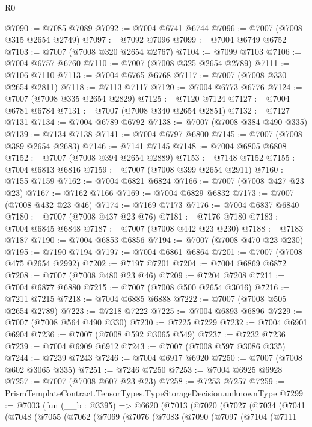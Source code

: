 \begin{lexlean}{R0}
\begin{coremodule}
@7090 := @7085 @7089
@7092 := @7004 @6741 @6744
@7096 := @7007 (@7008 @315 @2654 @2749)
@7097 := @7092 @7096
@7099 := @7004 @6749 @6752
@7103 := @7007 (@7008 @320 @2654 @2767)
@7104 := @7099 @7103
@7106 := @7004 @6757 @6760
@7110 := @7007 (@7008 @325 @2654 @2789)
@7111 := @7106 @7110
@7113 := @7004 @6765 @6768
@7117 := @7007 (@7008 @330 @2654 @2811)
@7118 := @7113 @7117
@7120 := @7004 @6773 @6776
@7124 := @7007 (@7008 @335 @2654 @2829)
@7125 := @7120 @7124
@7127 := @7004 @6781 @6784
@7131 := @7007 (@7008 @340 @2654 @2851)
@7132 := @7127 @7131
@7134 := @7004 @6789 @6792
@7138 := @7007 (@7008 @384 @490 @335)
@7139 := @7134 @7138
@7141 := @7004 @6797 @6800
@7145 := @7007 (@7008 @389 @2654 @2683)
@7146 := @7141 @7145
@7148 := @7004 @6805 @6808
@7152 := @7007 (@7008 @394 @2654 @2889)
@7153 := @7148 @7152
@7155 := @7004 @6813 @6816
@7159 := @7007 (@7008 @399 @2654 @2911)
@7160 := @7155 @7159
@7162 := @7004 @6821 @6824
@7166 := @7007 (@7008 @427 @23 @23)
@7167 := @7162 @7166
@7169 := @7004 @6829 @6832
@7173 := @7007 (@7008 @432 @23 @46)
@7174 := @7169 @7173
@7176 := @7004 @6837 @6840
@7180 := @7007 (@7008 @437 @23 @76)
@7181 := @7176 @7180
@7183 := @7004 @6845 @6848
@7187 := @7007 (@7008 @442 @23 @230)
@7188 := @7183 @7187
@7190 := @7004 @6853 @6856
@7194 := @7007 (@7008 @470 @23 @230)
@7195 := @7190 @7194
@7197 := @7004 @6861 @6864
@7201 := @7007 (@7008 @475 @2654 @2992)
@7202 := @7197 @7201
@7204 := @7004 @6869 @6872
@7208 := @7007 (@7008 @480 @23 @46)
@7209 := @7204 @7208
@7211 := @7004 @6877 @6880
@7215 := @7007 (@7008 @500 @2654 @3016)
@7216 := @7211 @7215
@7218 := @7004 @6885 @6888
@7222 := @7007 (@7008 @505 @2654 @2789)
@7223 := @7218 @7222
@7225 := @7004 @6893 @6896
@7229 := @7007 (@7008 @564 @490 @330)
@7230 := @7225 @7229
@7232 := @7004 @6901 @6904
@7236 := @7007 (@7008 @592 @3065 @549)
@7237 := @7232 @7236
@7239 := @7004 @6909 @6912
@7243 := @7007 (@7008 @597 @3086 @335)
@7244 := @7239 @7243
@7246 := @7004 @6917 @6920
@7250 := @7007 (@7008 @602 @3065 @335)
@7251 := @7246 @7250
@7253 := @7004 @6925 @6928
@7257 := @7007 (@7008 @607 @23 @23)
@7258 := @7253 @7257
@7259 := PrismTemplateContract.TensorTypes.TypeStorageDecision.unknownType
@7299 := @7003
    (fun (__b : @3395) =>
    @6620
      (@7013
        (@7020
          (@7027
            (@7034
              (@7041
                (@7048
                  (@7055
                    (@7062
                      (@7069
                        (@7076
                          (@7083
                            (@7090
                              (@7097
                                (@7104
                                  (@7111

\end{coremodule}
\end{lexlean}

